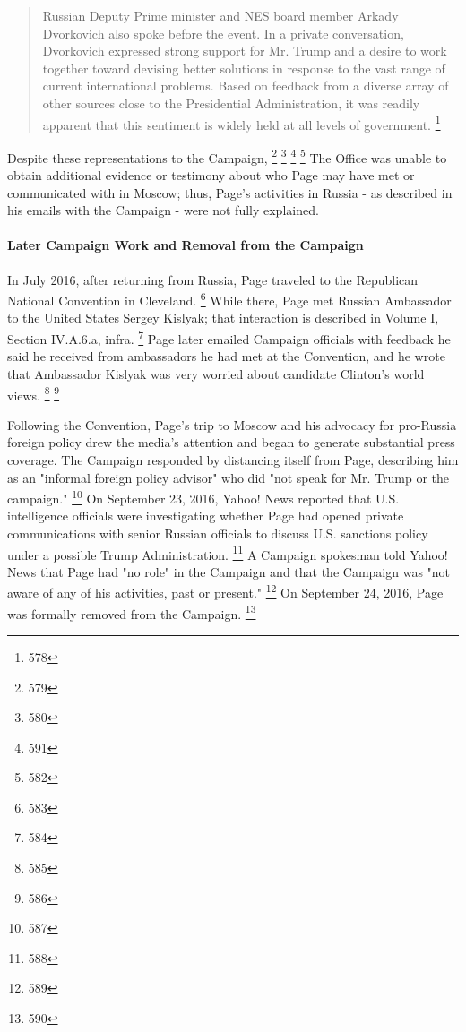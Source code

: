 \begin{quote}
Russian Deputy Prime minister and NES board member Arkady Dvorkovich also spoke before the event.
In a private conversation, Dvorkovich expressed strong support for Mr. Trump and a desire to work together toward devising better solutions in response to the vast range of current international problems.
Based on feedback from a diverse array of other sources close to the Presidential Administration, it was readily apparent that this sentiment is widely held at all levels of government.%
\footnote{578}
\end{quote}

Despite these representations to the Campaign,
\footnote{579}
\footnote{580}
\footnote{591}
\footnote{582}
The Office was unable to obtain additional evidence or testimony about who Page may have met or communicated with in Moscow; thus, Page's activities in Russia - as described in his emails with the Campaign - were not fully explained.

\paragraph{Later Campaign Work and Removal from the Campaign}

In July 2016, after returning from Russia, Page traveled to the Republican National Convention in Cleveland.%
\footnote{583}
While there, Page met Russian Ambassador to the United States Sergey Kislyak; that interaction is described in Volume I, Section IV.A.6.a, infra.%
\footnote{584}
Page later emailed Campaign officials with feedback he said he received from ambassadors he had met at the Convention, and he wrote that Ambassador Kislyak was very worried about candidate Clinton's world views.%
\footnote{585}
\footnote{586}

Following the Convention, Page's trip to Moscow and his advocacy for pro-Russia foreign policy drew the media's attention and began to generate substantial press coverage.
The Campaign responded by distancing itself from Page, describing him as an "informal foreign policy advisor" who did "not speak for Mr. Trump or the campaign."%
\footnote{587}
On September 23, 2016, Yahoo! News reported that U.S. intelligence officials were investigating whether Page had opened private communications with senior Russian officials to discuss U.S. sanctions policy under a possible Trump Administration.%
\footnote{588}
A Campaign spokesman told Yahoo! News that Page had "no role" in the Campaign and that the Campaign was "not aware of any of his activities, past or present."%
\footnote{589}
On September 24, 2016, Page was formally removed from the Campaign.%
\footnote{590}

